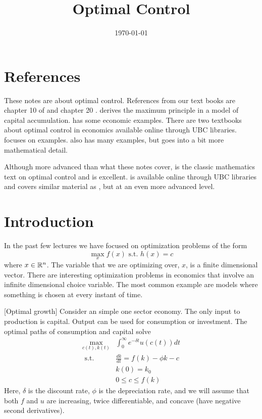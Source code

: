  

\title{Optimal Control}
\date{\today}



\maketitle

\section{References}

These notes are about optimal control.  References from our text books
are chapter 10 of \cite{dixit1990} and chapter 20 \cite{cw2005}.
\cite{dorfman1969} derives the maximum principle in a model of capital
accumulation. \cite{intriligator1975} has some economic
examples. There are two textbooks about optimal control in economics
available online through UBC libraries. \cite{sethi2000} focuses on
examples. \cite{caputo2005} also has many examples, but goes into a
bit more mathematical detail.

Although more advanced than what these notes cover,
\cite{luenberger1969} is the classic mathematics text on optimal
control and is excellent. \cite{clarke2013} is available online
through UBC libraries and covers similar material as
\cite{luenberger1969}, but at an even more advanced level. 


\section{Introduction}

In the past few lectures we have focused on optimization problems of the form 
\[ \max_{x} f(x) \text{ s.t. } h(x) = c \]
where $x \in\mathbb{R}^n$. The variable that we are optimizing over,
$x$, is a finite dimensional vector. There are interesting
optimization problems in economics that involve an infinite
dimensional choice variable. The most common example are models where
something is chosen at every instant of time.
\begin{example}\label{ex:grow}[Optimal growth]
  Consider an simple one sector economy. The only input to
  production is capital. Output can be used for consumption or
  investment. The optimal paths of consumption and capital solve
  \begin{align*}
    \max_{c(t),k(t)} & \int_0^\infty e^{-\delta t} u(c(t)) dt \\
    \text{ s.t. } & \frac{dk}{dt} = f(k) - \phi k - c \\
    & k(0) = k_0 \\
    & 0 \leq c \leq f(k)
  \end{align*}
  Here, $\delta$ is the discount rate, $\phi$ is the depreciation
  rate, and we will assume that both $f$ and $u$ are increasing, twice
  differentiable, and concave (have negative second derivatives).   
\end{example}

